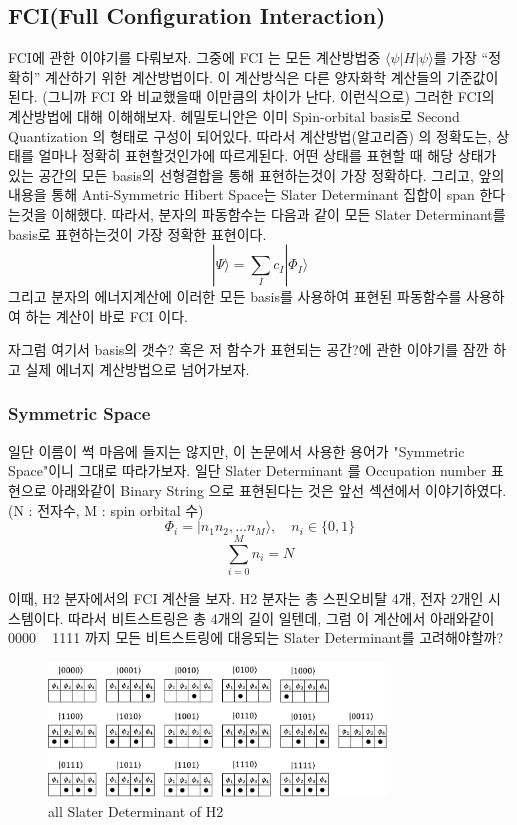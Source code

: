 \documentclass[11pt]{article}
\begin{document}
\subsection{FCI(Full Configuration Interaction)}
FCI에 관한 이야기를 다뤄보자. 그중에 FCI 는 모든 계산방법중 \(\langle \psi|H|\psi \rangle\)를 가장  \enquote{정확히} 계산하기 위한 계산방법이다. 
이 계산방식은 다른 양자화학 계산들의 기준값이 된다. (그니까 FCI 와 비교했을때 이만큼의 차이가 난다. 이런식으로) 그러한 FCI의 계산방법에 대해 이해해보자. 
헤밀토니안은 이미 Spin-orbital basis로 Second Quantization 의 형태로 구성이 되어있다. 따라서 계산방법(알고리즘) 의 정확도는, 상태를 얼마나 정확히 표현할것인가에 따르게된다. 
어떤 상태를 표현할 때 해당 상태가 있는 공간의 모든 basis의 선형결합을 통해 표현하는것이 가장 정확하다. 
그리고, 앞의 내용을 통해 Anti-Symmetric Hibert Space는 Slater Determinant 집합이 span 한다는것을 이해했다. 
따라서, 분자의 파동함수는 다음과 같이 모든 Slater Determinant를 basis로 표현하는것이 가장 정확한 표현이다. 
\[
|\Psi\rangle = \sum_I c_I |\Phi_I\rangle
\]
그리고 분자의 에너지계산에 이러한 모든 basis를 사용하여 표현된 파동함수를 사용하여 하는 계산이 바로 FCI 이다. 

자그럼 여기서 basis의 갯수? 혹은 저 함수가 표현되는 공간?에 관한 이야기를 잠깐 하고 실제 에너지 계산방법으로 넘어가보자. 
\subsubsection{Symmetric Space}
일단 이름이 썩 마음에 들지는 않지만, 이 논문에서 사용한 용어가 "Symmetric Space"이니 그대로 따라가보자. 
일단 Slater Determinant 를 Occupation number 표현으로 아래와같이 Binary String 으로 표현된다는 것은 앞선 섹션에서 이야기하였다. (N : 전자수, M : spin orbital 수)
\[\Phi_i = \vert n_1n_2,\dots n_M \rangle ,\quad n_i \in \{0,1\}\]
\[\sum_{i=0}^{M}n_i = N\]

이때, H2 분자에서의 FCI 계산을 보자.
H2 분자는 총 스핀오비탈 4개, 전자 2개인 시스템이다. 
따라서 비트스트링은 총 4개의 길이 일텐데, 그럼 이 계산에서 아래와같이 0000 ~ 1111 까지 모든 비트스트링에 대응되는 Slater Determinant를 고려해야할까? 

\begin{figure}[htbp]
  \centering
  \includegraphics[width=0.8\textwidth]{fig/Cofig.png}
  \caption{all Slater Determinant of H2}
  \label{fig:example2}
\end{figure}
\end{document}

